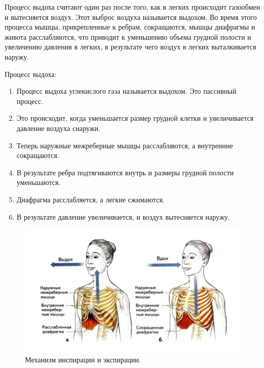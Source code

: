 \documentclass{article}
\begin{document}
        \hspace*{4mm} Процесс выдоха считают один раз после того, как в легких происходит
        газообмен и вытесняется воздух. Этот выброс воздуха называется выдохом. Во
        время этого процесса мышцы, прикрепленные к ребрам, сокращаются, мышцы
        диафрагмы и живота расслабляются, что приводит к уменьшению объема
        грудной полости и увеличению давления в легких, в результате чего воздух в
        легких выталкивается наружу.
        \vspace*{4mm}

        Процесс выдоха:

        \begin{enumerate}
            \item Процесс выдоха углекислого газа называется выдохом. Это пассивный
            процесс.

            \item Это происходит, когда уменьшается размер грудной клетки и
            увеличивается давление воздуха снаружи.

            \item Теперь наружные межреберные мышцы расслабляются, а внутренние
            сокращаются.

            \item В результате ребра подтягиваются внутрь и размеры грудной полости
            уменьшаются.

            \item Диафрагма расслабляется, а легкие сжимаются.
            
            \item В результате давление увеличивается, и воздух вытесняется наружу.
        \end{enumerate}

        \begin{figure}[h]
            \centering
            \includegraphics[width=\textwidth]{Инспирация_Экспирация.png}
            \caption{Механизм инспирации и экспирации.}
        \end{figure}
        \newpage
\end{document}
